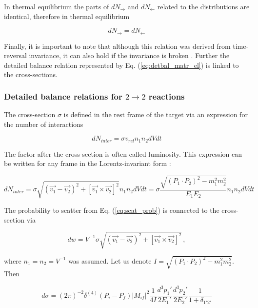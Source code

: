 In thermal equilibrium the parts of $dN_{\rightarrow}$ and
$dN_{\leftarrow}$ related to the distributions are identical, therefore
in thermal equilibrium

\begin{equation} \label{eq:det_bal_reactions}
  dN_{\rightarrow} = dN_{\leftarrow}
\end{equation}

Finally, it is important to note that although this relation was derived from
time-reversal invariance, it can also hold if the invariance is broken
\cite{Sachs_time_reversal}. Further the detailed balance relation represented
by Eq. (\ref{eq:detbal_matr_el}) is linked to the cross-sections.


\subsubsection{Detailed balance relations for $ 2\to 2$ reactions} \label{sec:detbal_2to2}

The cross-section $\sigma$ is defined in the rest frame of the target
via an expression for the number of interactions

\begin{equation}
  dN_{inter} = \sigma v_{rel} n_1 n_2 dV dt
\end{equation}

The factor after the cross-section is often called luminosity. This expression can
be written for any frame in the Lorentz-invariant form \cite{Lifsh2}:

\begin{equation}
  dN_{inter} = \sigma \sqrt{(\vec{v_1}-\vec{v_2})^2 + [\vec{v_1}\times \vec{v_2}]^2}
  n_1 n_2 dV dt = \sigma \frac{\sqrt{(P_1 \cdot P_2)^2 - m_1^2 m_2^2}}{E_1 E_2}
  n_1 n_2 dV dt
\end{equation}

The probability to scatter from Eq. (\ref{eq:scat_prob}) is connected
to the cross-section via

\begin{equation}
  dw = V^{-1} \sigma  \sqrt{(\vec{v_1}-\vec{v_2})^2 + [\vec{v_1}\times \vec{v_2}]^2} \,,
\end{equation}

where $n_1 = n_2  = V^{-1}$ was assumed. Let us denote
$I = \sqrt{(P_1 \cdot P_2)^2 - m_1^2 m_2^2}$. Then

\begin{equation}
  d\sigma = (2\pi)^{-2} \delta^{(4)}(P_i-P_f) |M_{if}|^2 \frac{1}{4 I}
  \frac{d^3p_1'}{2E_1'} \frac{d^3p_2'}{2E_2'} \frac{1}{1+\delta_{1'2'}}
\end{equation}


